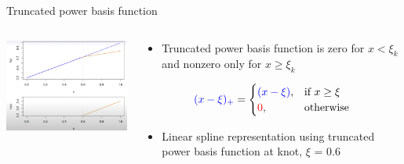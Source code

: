 \documentclass[english]{beamer}
\newcommand{\alertblue}[1]{{\color{blue}#1}}
\begin{document}
\begin{frame}{Truncated power basis function}
 \begin{columns}
     \begin{column}{0.6\textwidth} 
         \centering
         \includegraphics[width=6.5cm,keepaspectratio]{images/truncated_linear.png}
     \end{column}
     \begin{column}{0.5\textwidth} 
         \begin{itemize}
             \item Truncated power basis function is \alertblue{zero} for \alertblue{\( x < \xi_k \)} and \alertblue{nonzero} only for \alertblue{\( x \geq \xi_k \)}
         \end{itemize}
         \begin{equation*}
             \alertblue{(x - \xi)_+} =
             \begin{cases}
                 \alertblue{(x - \xi)}, & \text{if } x \geq \xi \\
                 \textcolor{red}{0}, & \text{otherwise}
             \end{cases}
         \end{equation*}
         \begin{itemize}
             \item Linear spline representation using truncated power basis function at \alertblue{knot, \(\xi\) = 0.6}
         \end{itemize}
     \end{column}
 \end{columns}
\end{frame}
\end{document}
